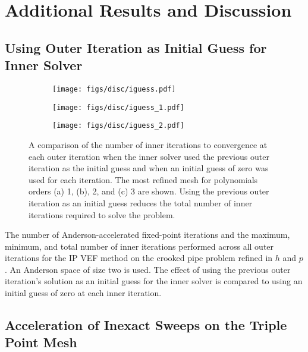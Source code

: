 \documentclass[../doc.tex]{subfiles}
\begin{document}
\chapter{Additional Results and Discussion}
\section{Using Outer Iteration as Initial Guess for Inner Solver}
\begin{figure}
\centering 
\begin{subfigure}{.32\textwidth}
	\centering
	\texttt{[image: figs/disc/iguess.pdf]}
	\caption{}
\end{subfigure}
\begin{subfigure}{.32\textwidth}
	\centering
	\texttt{[image: figs/disc/iguess\_1.pdf]}
	\caption{}
\end{subfigure}
\begin{subfigure}{.32\textwidth}
	\centering
	\texttt{[image: figs/disc/iguess\_2.pdf]}
	\caption{}
\end{subfigure}
\caption{A comparison of the number of inner iterations to convergence at each outer iteration when the inner solver used the previous outer iteration as the initial guess and when an initial guess of zero was used for each iteration. The most refined mesh for polynomials orders (a) 1, (b), 2, and (c) 3 are shown. Using the previous outer iteration as an initial guess reduces the total number of inner iterations required to solve the problem.}
\label{disc:iguess}
\end{figure}

\begin{table}
\centering
\caption{The number of Anderson-accelerated fixed-point iterations and the maximum, minimum, and total number of inner iterations performed across all outer iterations for the IP VEF method on the crooked pipe problem refined in $h$ and $p$. An Anderson space of size two is used. The effect of using the previous outer iteration's solution as an initial guess for the inner solver is compared to using an initial guess of zero at each inner iteration. }
\label{}

\end{table}

\section{Acceleration of Inexact Sweeps on the Triple Point Mesh}
\end{document}
